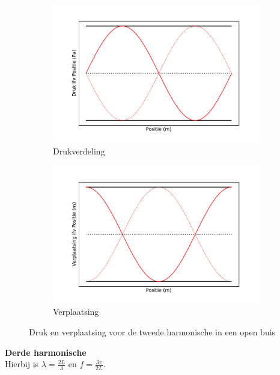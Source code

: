 \documentclass[a4paper,kul]{kulakarticle} %
\begin{document}
\begin{figure}[!h]
	\centering
	\begin{subfigure}{.5\textwidth}
		\centering
		\includegraphics[width=1\linewidth]{OpenBuisTweedeDruk}
		\caption{Drukverdeling}
		\label{fig:TweedeBuisDruk}
	\end{subfigure}%
	\begin{subfigure}{.5\textwidth}
		\centering
		\includegraphics[width=1\linewidth]{OpenBuisTweedeVerplaatsing}
		\caption{Verplaatsing}
		\label{fig:TweedeBuisVerplaatsing}
	\end{subfigure}
	\caption{Druk en verplaatsing voor de tweede harmonische in een open buis}
	\label{fig:OpenBuisTweede}
\end{figure}

\textbf{Derde harmonische}\\
Hierbij is $\lambda = \frac{2L}{3}$ en $f=\frac{3v}{2L}$.
\end{document}
